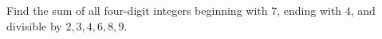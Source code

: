 Find the sum of all four-digit integers beginning with $7$, ending with $4$, and divisible by $2,3,4,6,8,9$.
